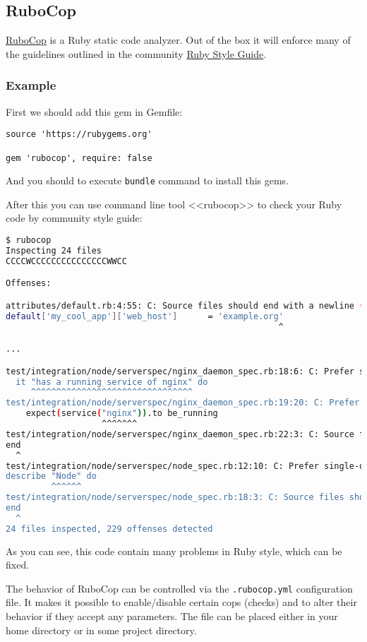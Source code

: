 \subsection{RuboCop}

\href{https://github.com/bbatsov/rubocop}{RuboCop} is a Ruby static code analyzer. Out of the box it will enforce many of the guidelines outlined in the community \href{https://github.com/bbatsov/ruby-style-guide}{Ruby Style Guide}.

\subsubsection{Example}

First we should add this gem in Gemfile:

\begin{lstlisting}[label=lst:testing-test-kitchen1]
source 'https://rubygems.org'

gem 'rubocop', require: false
\end{lstlisting}

And you should to execute \lstinline!bundle! command to install this gems.

After this you can use command line tool <<rubocop>> to check your Ruby code by community style guide:

\begin{lstlisting}[language=Bash,label=lst:testing-robocop1]
$ rubocop
Inspecting 24 files
CCCCWCCCCCCCCCCCCCCCWWCC

Offenses:

attributes/default.rb:4:55: C: Source files should end with a newline (\n).
default['my_cool_app']['web_host']      = 'example.org'
                                                      ^

...

test/integration/node/serverspec/nginx_daemon_spec.rb:18:6: C: Prefer single-quoted strings when you don't need string interpolation or special symbols.
  it "has a running service of nginx" do
     ^^^^^^^^^^^^^^^^^^^^^^^^^^^^^^^^
test/integration/node/serverspec/nginx_daemon_spec.rb:19:20: C: Prefer single-quoted strings when you don't need string interpolation or special symbols.
    expect(service("nginx")).to be_running
                   ^^^^^^^
test/integration/node/serverspec/nginx_daemon_spec.rb:22:3: C: Source files should end with a newline (\n).
end
  ^
test/integration/node/serverspec/node_spec.rb:12:10: C: Prefer single-quoted strings when you don't need string interpolation or special symbols.
describe "Node" do
         ^^^^^^
test/integration/node/serverspec/node_spec.rb:18:3: C: Source files should end with a newline (\n).
end
  ^
24 files inspected, 229 offenses detected
\end{lstlisting}

As you can see, this code contain many problems in Ruby style, which can be fixed.

The behavior of RuboCop can be controlled via the \lstinline!.rubocop.yml! configuration file. It makes it possible to enable/disable certain cops (checks) and to alter their behavior if they accept any parameters. The file can be placed either in your home directory or in some project directory.